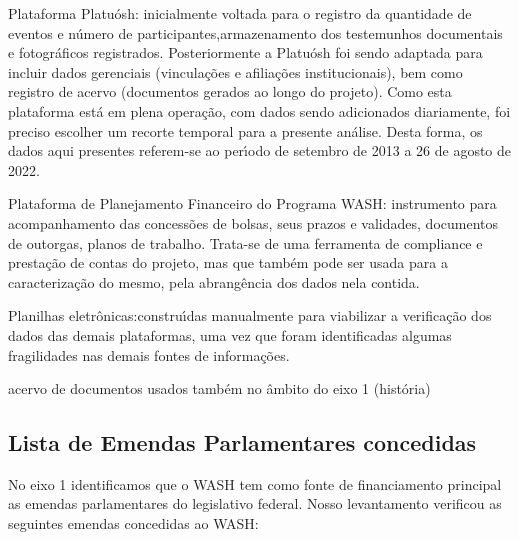 \documentclass[
12pt,		%
openright,	%
twoside,  %
a4paper,			%
chapter=TITLE,		%
english,			%
french,				%
spanish,			%
brazil				%
]{USPSC-classe/USPSC}
\begin{document}
\begin{alineas}
\item Plataforma Platu\'osh: inicialmente  voltada para o registro da quantidade de eventos e n\'umero de participantes,armazenamento dos testemunhos documentais e fotogr\'aficos registrados. Posteriormente a Platu\'osh foi sendo adaptada para incluir dados gerenciais (vincula\c{c}\~oes e afilia\c{c}\~oes institucionais), bem como registro de acervo (documentos gerados ao longo do projeto). Como esta plataforma est\'a em plena opera\c{c}\~ao, com dados sendo adicionados diariamente, foi preciso escolher um recorte temporal para a presente an\'alise. Desta forma, os dados aqui presentes referem-se ao per\'{\i}odo de setembro de 2013 a 26 de agosto de 2022.
\item Plataforma de Planejamento Financeiro do Programa WASH: instrumento para acompanhamento das concess\~oes de bolsas, seus prazos e validades, documentos de outorgas, planos de trabalho. Trata-se de uma ferramenta de compliance e presta\c{c}\~ao de contas do projeto, mas que tamb\'em pode ser usada para a caracteriza\c{c}\~ao do mesmo, pela abrang\^encia dos dados nela contida.
\item Planilhas eletr\^onicas:constru\'{\i}das  manualmente para viabilizar a verifica\c{c}\~ao dos dados das demais plataformas, uma vez que foram identificadas algumas fragilidades nas demais fontes de informa\c{c}\~oes.
\item acervo de documentos usados tamb\'em no \^ambito do eixo 1 (hist\'oria)
\end{alineas}

\subsection[Lista de Emendas Parlamentares concedidas]{Lista de Emendas Parlamentares concedidas}\label{Lista de Emendas Parlamentares concedidas}
No eixo 1 identificamos que o WASH tem como fonte de financiamento principal as emendas parlamentares do legislativo federal. Nosso levantamento verificou as seguintes emendas concedidas ao WASH:
\end{document}
